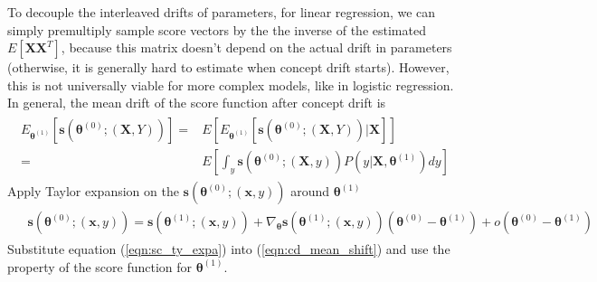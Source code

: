 \documentclass[twoside,11pt]{article}
\begin{document}
To decouple the interleaved drifts of parameters, for linear regression, we can simply premultiply sample score vectors by the {the inverse of the estimated} $E [\bm {X}\bm {X}^T]$, because this matrix doesn't depend on the actual drift in parameters (otherwise, it is generally hard to estimate when concept drift starts). However, this is not universally viable for more complex models, like in logistic regression. In general, the mean {drift} of the score function after concept drift is
\begin{align}
\begin{aligned}
E _{\bm { \theta}^{ (1)}}[\bm{s}(\bm { \theta}^{ (0)}; (\bm {X}, Y))] 
= & E[E _{\bm { \theta}^{ (1)}}[\bm{s}(\bm { \theta}^{ (0)}; (\bm {X}, Y))| \bm {X}] ] \\
= & E[\int _{y}\bm{s}(\bm { \theta}^{ (0)}; (\bm {X}, y)) P(y | \bm {X}, \bm{\theta} ^{ (1)}) dy ]
\end{aligned}
\label{eqn:cd_mean_shift}
\end{align}
Apply Taylor expansion on the $\bm{s}(\bm { \theta}^{ (0)}; (\bm {x}, y))$ around $\bm { \theta} ^{ (1)}$
\begin{align}
\begin{aligned}
 &\bm{s}(\bm { \theta}^{ (0)}; (\bm {x}, y)) = \bm{s}(\bm { \theta}^{ (1)}; (\bm {x}, y)) 
 + \nabla _{\bm { \theta}}{ \bm{s}(\bm { \theta}^{ (1)}; (\bm {x}, y))}(\bm { \theta}^ { (0)} - \bm { \theta} ^{ (1)}) 
 + o(\bm { \theta}^ { (0)} - \bm { \theta} ^{ (1)} ) 
\end{aligned}
\label{eqn:sc_ty_expa}
\end{align}
Substitute equation (\ref{eqn:sc_ty_expa}) into (\ref{eqn:cd_mean_shift}) and use the property of the score function for $\bm { \theta} ^{ (1)}$.
\end{document}
